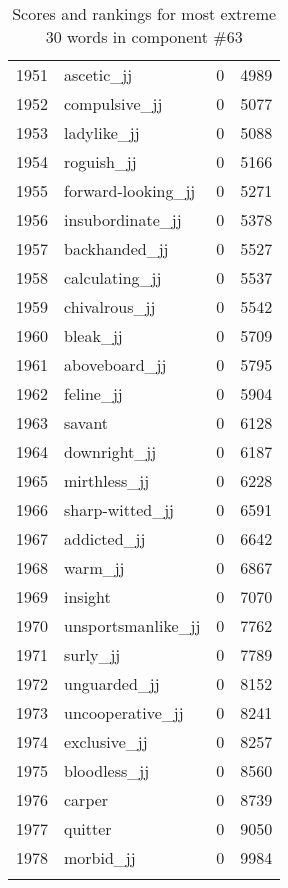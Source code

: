 \begin{longtable}[!htbp]{| rlr@{.}l |}
    1951 & ascetic\_jj & 0 & 4989 \\
    1952 & compulsive\_jj & 0 & 5077 \\
    1953 & ladylike\_jj & 0 & 5088 \\
    1954 & roguish\_jj & 0 & 5166 \\
    1955 & forward-looking\_jj & 0 & 5271 \\
    1956 & insubordinate\_jj & 0 & 5378 \\
    1957 & backhanded\_jj & 0 & 5527 \\
    1958 & calculating\_jj & 0 & 5537 \\
    1959 & chivalrous\_jj & 0 & 5542 \\
    1960 & bleak\_jj & 0 & 5709 \\
    1961 & aboveboard\_jj & 0 & 5795 \\
    1962 & feline\_jj & 0 & 5904 \\
    1963 & savant & 0 & 6128 \\
    1964 & downright\_jj & 0 & 6187 \\
    1965 & mirthless\_jj & 0 & 6228 \\
    1966 & sharp-witted\_jj & 0 & 6591 \\
    1967 & addicted\_jj & 0 & 6642 \\
    1968 & warm\_jj & 0 & 6867 \\
    1969 & insight & 0 & 7070 \\
    1970 & unsportsmanlike\_jj & 0 & 7762 \\
    1971 & surly\_jj & 0 & 7789 \\
    1972 & unguarded\_jj & 0 & 8152 \\
    1973 & uncooperative\_jj & 0 & 8241 \\
    1974 & exclusive\_jj & 0 & 8257 \\
    1975 & bloodless\_jj & 0 & 8560 \\
    1976 & carper & 0 & 8739 \\
    1977 & quitter & 0 & 9050 \\
    1978 & morbid\_jj & 0 & 9984 \\
    \hline
    \caption{Scores and rankings for most extreme 30 words in component \#63} \\
\end{longtable}
